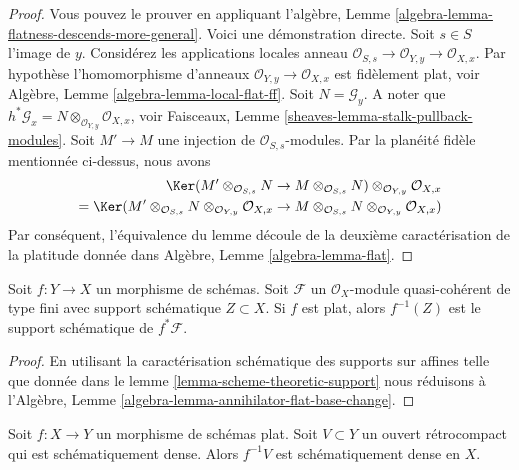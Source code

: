 \begin{proof}
Vous pouvez le prouver
en appliquant l'algèbre, Lemme \ref{algebra-lemma-flatness-descends-more-general}.
Voici une démonstration directe. Soit $s \in S$
l'image de
$y$. Considérez les applications locales
anneau $\mathcal{O}_{S, s} \to \mathcal{O}_{Y, y} \to \mathcal{O}_{X, x}$. Par hypothèse l'homomorphisme
d'anneaux $\mathcal{O}_{Y, y} \to \mathcal{O}_{X, x}$
est fidèlement plat, voir
Algèbre, Lemme \ref{algebra-lemma-local-flat-ff}.
Soit $N = \mathcal{G}_y$. A noter que $h^*\mathcal{G}_x = N \otimes_{\mathcal{O}_{Y, y}} \mathcal{O}_{X, x}$, voir
Faisceaux, Lemme \ref{sheaves-lemma-stalk-pullback-modules}. Soit $M' \to M$
une injection de $\mathcal{O}_{S, s}$-modules.
Par la planéité fidèle mentionnée ci-dessus, nous avons
\begin{align*}
\Ker(
M' \otimes_{\mathcal{O}_{S, s}} N \to M \otimes_{\mathcal{O}_{S, s}} N)
\otimes_{\mathcal{O}_{Y, y}} \mathcal{O}_{X, x} \\
=
\Ker(
M' \otimes_{\mathcal{O}_{S, s}} N
\otimes_{\mathcal{O}_{Y, y}} \mathcal{O}_{X, x}
\to
M \otimes_{\mathcal{O}_{S, s}} N
\otimes_{\mathcal{O}_{Y, y}} \mathcal{O}_{X, x})
\end{align*}
Par conséquent, l'équivalence du lemme découle de la deuxième caractérisation
de la platitude donnée dans
Algèbre, Lemme \ref{algebra-lemma-flat}.
\end{proof}

\begin{lemma}
\label{lemma-flat-pullback-support}
Soit $f : Y \to X$ un morphisme de schémas. Soit $\mathcal{F}$ un
$\mathcal{O}_X$-module quasi-cohérent de type fini avec support
schématique $Z \subset X$. Si $f$ est plat,
alors $f^{-1}(Z)$ est le support schématique de $f^*\mathcal{F}$.
\end{lemma}

\begin{proof}
En utilisant la caractérisation schématique des supports
sur affines telle que donnée dans le lemme \ref{lemma-scheme-theoretic-support}
nous réduisons à l'Algèbre, Lemme \ref{algebra-lemma-annihilator-flat-base-change}.
\end{proof}

\begin{lemma}
\label{lemma-flat-morphism-scheme-theoretically-dense-open}
Soit $f : X \to Y$ un morphisme de schémas plat. Soit $V \subset Y$ un ouvert
rétrocompact qui est schématiquement dense. Alors $f^{-1}V$ est schématiquement
dense en $X$.
\end{lemma}


